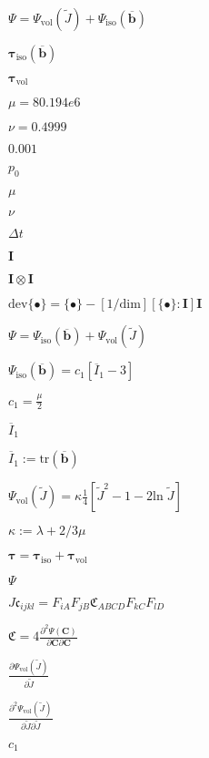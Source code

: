 \documentclass{article}
\begin{document}
$\Psi = \Psi_\text{vol}(\widetilde{J}) + \Psi_\text{iso}(\overline{\mathbf{b}})$
\pagebreak

${\boldsymbol{\tau}}_{\text{iso}}(\overline{\mathbf{b}})$
\pagebreak

${\boldsymbol{\tau}}_{\text{vol}}$
\pagebreak

$\mu = 80.194e6$
\pagebreak

$\nu = 0.4999$
\pagebreak

$0.001$
\pagebreak

$p_0$
\pagebreak

$ \mu $
\pagebreak

$ \nu $
\pagebreak

$ \varDelta t $
\pagebreak

$\mathbf{I}$
\pagebreak

$\mathbf{I} \otimes \mathbf{I}$
\pagebreak

$\textrm{dev} \{ \bullet \} = \{ \bullet \} - [1/\textrm{dim}][ \{ \bullet\} :\mathbf{I}]\mathbf{I}$
\pagebreak

$ \Psi = \Psi_{\text{iso}}(\overline{\mathbf{b}}) + \Psi_{\text{vol}}(\widetilde{J}) $
\pagebreak

$ \Psi_{\text{iso}}(\overline{\mathbf{b}}) = c_{1} [\overline{I}_{1} - 3] $
\pagebreak

$ c_{1} = \frac{\mu}{2} $
\pagebreak

$\overline{I}_{1}$
\pagebreak

$\overline{I}_1 :=\textrm{tr}(\overline{\mathbf{b}})$
\pagebreak

$ \Psi_{\text{vol}}(\widetilde{J}) = \kappa \frac{1}{4} [ \widetilde{J}^2 - 1 - 2\textrm{ln}\; \widetilde{J} ]$
\pagebreak

$\kappa:= \lambda + 2/3 \mu$
\pagebreak

$\boldsymbol{\tau} = \boldsymbol{\tau}_{\textrm{iso}} + \boldsymbol{\tau}_{\textrm{vol}}$
\pagebreak

$\Psi$
\pagebreak

$ J \mathfrak{c}_{ijkl} = F_{iA} F_{jB} \mathfrak{C}_{ABCD} F_{kC} F_{lD}$
\pagebreak

$ \mathfrak{C} = 4 \frac{\partial^2 \Psi(\mathbf{C})}{\partial \mathbf{C} \partial \mathbf{C}}$
\pagebreak

$\frac{\partial \Psi_{\text{vol}}(\widetilde{J})}{\partial \widetilde{J}}$
\pagebreak

$\frac{\partial^2 \Psi_{\textrm{vol}}(\widetilde{J})}{\partial \widetilde{J} \partial \widetilde{J}}$
\pagebreak

$c_1$
\pagebreak
\end{document}
